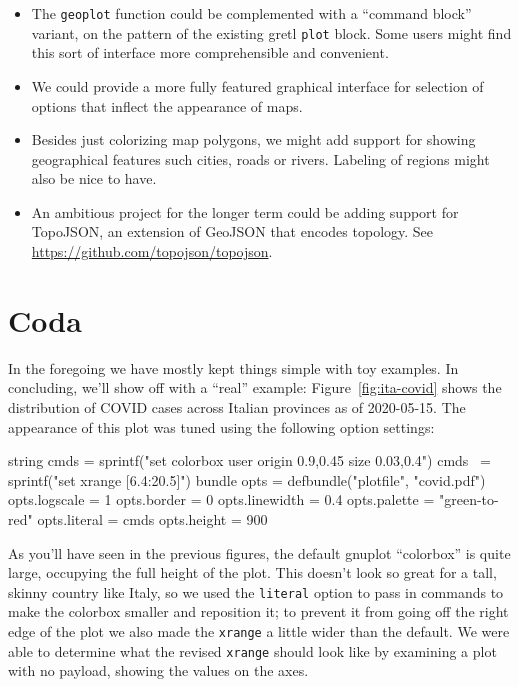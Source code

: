 \documentclass{article}
\begin{document}
\begin{itemize}
\item The \texttt{geoplot} function could be complemented with a
  ``command block'' variant, on the pattern of the existing gretl
  \texttt{plot} block. Some users might find this sort of interface
  more comprehensible and convenient.
\item We could provide a more fully featured graphical interface for
  selection of options that inflect the appearance of maps.
\item Besides just colorizing map polygons, we might add support for
  showing geographical features such cities, roads or rivers.
  Labeling of regions might also be nice to have.
\item An ambitious project for the longer term could be adding support
  for TopoJSON, an extension of GeoJSON that encodes topology. See
  \url{https://github.com/topojson/topojson}.
\end{itemize}

\section{Coda}

In the foregoing we have mostly kept things simple with toy
examples. In concluding, we'll show off with a ``real'' example:
Figure~\ref{fig:ita-covid} shows the distribution of COVID cases
across Italian provinces as of 2020-05-15. The appearance of this plot
was tuned using the following option settings:
\begin{code}
string cmds = sprintf("set colorbox user origin 0.9,0.45 size 0.03,0.4\n")
cmds ~= sprintf("set xrange [6.4:20.5]")
bundle opts = defbundle("plotfile", "covid.pdf")
opts.logscale = 1
opts.border = 0
opts.linewidth = 0.4
opts.palette = "green-to-red"
opts.literal = cmds
opts.height = 900
\end{code}

As you'll have seen in the previous figures, the default
\textsf{gnuplot} ``colorbox'' is quite large, occupying the full
height of the plot.  This doesn't look so great for a tall, skinny
country like Italy, so we used the \texttt{literal} option to pass in
commands to make the colorbox smaller and reposition it; to prevent it
from going off the right edge of the plot we also made the
\texttt{xrange} a little wider than the default. We were able to
determine what the revised \texttt{xrange} should look like by
examining a plot with no payload, showing the values on the axes.
\end{document}
